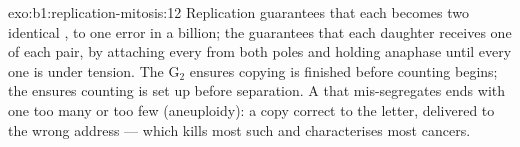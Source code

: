 \begin{solution}{exo:b1:replication-mitosis:12}
Replication guarantees that each  becomes two identical
, to one error in a billion; the  guarantees that
each daughter receives one of each pair, by attaching every 
from both poles and holding anaphase until every one is under tension.
The G$_2$  ensures copying is finished before counting
begins; the   ensures counting is set up before
separation. A  that mis-segregates ends with one  too
many or too few (aneuploidy): a copy correct to the letter, delivered
to the wrong address --- which kills most such  and characterises
most cancers.
\end{solution}

